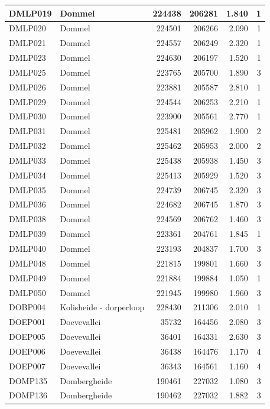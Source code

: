 \documentclass[11pt,]{book}
\begin{document}
\begin{table}
\begin{tabular}[t]{l|l|r|r|r|r}
\hline
DMLP019 & Dommel & 224438 & 206281 & 1.840 & 1\\
\hline
DMLP020 & Dommel & 224501 & 206266 & 2.090 & 1\\
\hline
DMLP021 & Dommel & 224557 & 206249 & 2.320 & 1\\
\hline
DMLP023 & Dommel & 224630 & 206197 & 1.520 & 1\\
\hline
DMLP025 & Dommel & 223765 & 205700 & 1.890 & 3\\
\hline
DMLP026 & Dommel & 223881 & 205587 & 2.810 & 1\\
\hline
DMLP029 & Dommel & 224544 & 206253 & 2.210 & 1\\
\hline
DMLP030 & Dommel & 223900 & 205561 & 2.770 & 1\\
\hline
DMLP031 & Dommel & 225481 & 205962 & 1.900 & 2\\
\hline
DMLP032 & Dommel & 225462 & 205953 & 2.000 & 2\\
\hline
DMLP033 & Dommel & 225438 & 205938 & 1.450 & 3\\
\hline
DMLP034 & Dommel & 225413 & 205929 & 1.520 & 3\\
\hline
DMLP035 & Dommel & 224739 & 206745 & 2.320 & 3\\
\hline
DMLP036 & Dommel & 224682 & 206745 & 1.870 & 3\\
\hline
DMLP038 & Dommel & 224569 & 206762 & 1.460 & 3\\
\hline
DMLP039 & Dommel & 223361 & 204761 & 1.845 & 1\\
\hline
DMLP040 & Dommel & 223193 & 204837 & 1.700 & 3\\
\hline
DMLP048 & Dommel & 221815 & 199801 & 1.660 & 3\\
\hline
DMLP049 & Dommel & 221884 & 199884 & 1.050 & 1\\
\hline
DMLP050 & Dommel & 221945 & 199980 & 1.960 & 3\\
\hline
DOBP004 & Kolisheide - dorperloop & 228430 & 211306 & 2.010 & 1\\
\hline
DOEP001 & Doevevallei & 35732 & 164456 & 2.080 & 3\\
\hline
DOEP005 & Doevevallei & 36401 & 164331 & 2.630 & 3\\
\hline
DOEP006 & Doevevallei & 36438 & 164476 & 1.170 & 4\\
\hline
DOEP007 & Doevevallei & 36343 & 164561 & 1.160 & 4\\
\hline
DOMP135 & Dombergheide & 190461 & 227032 & 1.080 & 3\\
\hline
DOMP136 & Dombergheide & 190462 & 227032 & 1.882 & 3\\

\end{tabular}
\end{table}
\end{document}
